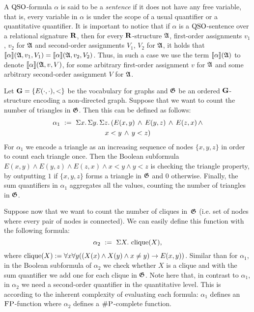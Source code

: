 A ${\rm QSO}$-formula $\alpha$ is said to be a \emph{sentence} if it does not have any free variable, that is, every variable in $\alpha$ is under the scope of a usual quantifier or a quantitative quantifier. It is important to notice that if $\alpha$ is a ${\rm QSO}$-sentence over a relational signature $\mathbf{R}$, then for every $\mathbf{R}$-structure $\mathfrak{A}$, first-order assignments $v_1$, $v_2$ for $\mathfrak{A}$ and second-order assignments $V_1$, $V_2$ for $\mathfrak{A}$, it holds that ${\llbracket{}{\alpha}\rrbracket}(\mathfrak{A}, v_1, V_1) = {\llbracket{}{\alpha}\rrbracket}(\mathfrak{A}, v_2, V_2)$.
Thus, in such a case we use the term ${\llbracket{}{\alpha}\rrbracket}(\mathfrak{A})$ to denote ${\llbracket{}{\alpha}\rrbracket}(\mathfrak{A}, v, V)$, for some arbitrary first-order assignment $v$ for $\mathfrak{A}$ and some arbitrary second-order assignment $V$ for $\mathfrak{A}$. 
\begin{example}\label{ex:cliques}
Let $\mathbf{G} = \{E(\cdot,\cdot),<\}$ be the vocabulary for graphs and $\mathfrak{G}$ be an ordered $\mathbf{G}$-structure encoding a non-directed graph. 
Suppose that we want to count the number of triangles in $\mathfrak{G}$. Then this can be defined as follows:
\begin{multline*}
\alpha_1 \ := \ \Sigma{x}.\, \Sigma{y}.\, \Sigma{z}.\, ( E(x,y) \, \wedge \, E(y,z) \, \wedge \, E(z,x) \, \wedge \\
x < y \, \wedge \, y < z )
\end{multline*}
For $\alpha_1$ we encode a triangle as an increasing sequence of nodes $\{x, y, z\}$ in order to count each triangle once. Then the Boolean subformula  $E(x,y) \wedge E(y,z) \wedge E(z,x) \wedge
x < y \wedge y < z$ is checking the triangle property, by outputting $1$ if $\{x, y, z\}$ forms a triangle in $\mathfrak{G}$ and $0$ otherwise.
Finally, the sum quantifiers in $\alpha_1$ aggregates all the values, counting the number of triangles in $\mathfrak{G}$.

Suppose now that we want to count the number of cliques in~$\mathfrak{G}$ (i.e. set of nodes where every pair of nodes is connected). We can easily define this function with the following formula:
$$
\alpha_2 \ := \ \Sigma{X}.\, \operatorname{clique}(X) ,
$$ 
where $\operatorname{clique}(X) := \forall x \forall y ((X(x) \wedge X(y) \wedge x \neq y)  \rightarrow E(x,y))$.
Similar than for $\alpha_1$, in the Boolean subformula of $\alpha_2$ we check whether $X$ is a clique and with the sum quantifier we add one for each clique in $\mathfrak{G}$. 
Note here that, in contrast to $\alpha_1$, in $\alpha_2$ we need a second-order quantifier in the quantitative level.
This is according to the inherent complexity of evaluating each formula: $\alpha_1$ defines an $\text{\sc FP}$-function where $\alpha_2$ defines a $\text{\sc \#P}$-complete function.
\end{example}
